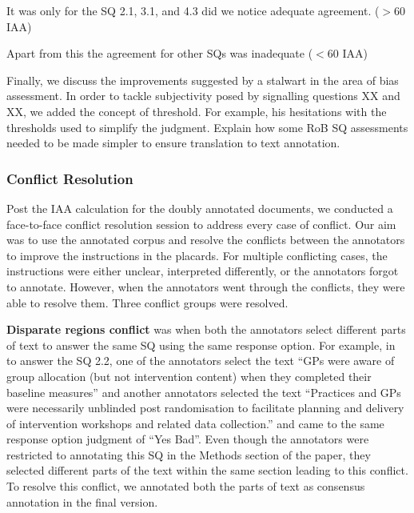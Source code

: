 \documentclass[sn-mathphys,Numbered]{sn-jnl}%
\theoremstyle{thmstyleone}%
\theoremstyle{thmstyletwo}%
\theoremstyle{thmstylethree}%
\begin{document}
It was only for the SQ 2.1, 3.1, and 4.3 did we notice adequate agreement. ($>$60 IAA)

Apart from this the agreement for other SQs was inadequate ($<$60 IAA)




Finally, we discuss the improvements suggested by a stalwart in the area of bias assessment.
In order to tackle subjectivity posed by signalling questions XX and XX, we added the concept of threshold.
For example, his hesitations with the thresholds used to simplify the judgment.
Explain how some RoB SQ assessments needed to be made simpler to ensure translation to text annotation.
%
%
%
\subsubsection{Conflict Resolution}
\label{dis:conflict}
%
Post the IAA calculation for the doubly annotated documents, we conducted a face-to-face conflict resolution session to address every case of conflict.
Our aim was to use the annotated corpus and resolve the conflicts between the annotators to improve the instructions in the placards.
For multiple conflicting cases, the instructions were either unclear, interpreted differently, or the annotators forgot to annotate.
However, when the annotators went through the conflicts, they were able to resolve them.
Three conflict groups were resolved.

\textbf{Disparate regions conflict} was when both the annotators select different parts of text to answer the same SQ using the same response option.
For example, in~\cite{darlow2019fear} to answer the SQ 2.2, one of the annotators select the text ``GPs were aware of group allocation (but not intervention content) when they completed their baseline measures'' and another annotators selected the text ``Practices and GPs were necessarily unblinded post randomisation to facilitate planning and delivery of intervention workshops and related data collection.'' and came to the same response option judgment of ``Yes Bad''.
Even though the annotators were restricted to annotating this SQ in the Methods section of the paper, they selected different parts of the text within the same section leading to this conflict.
To resolve this conflict, we annotated both the parts of text as consensus annotation in the final version.
\end{document}
